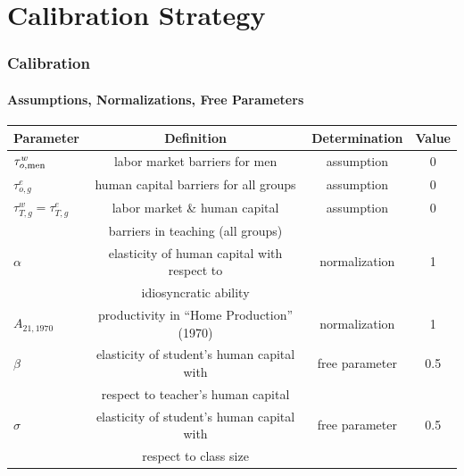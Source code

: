\documentclass[11pt,hyperref={bookmarks=false},table,aspectratio=169]{beamer}
\begin{document}
\section{Calibration Strategy}	
\begin{frame}
\frametitle{Calibration}
\framesubtitle{Assumptions, Normalizations, Free Parameters}
  \footnotesize
	
	\begin{table}[h!]
		\centering
		\begin{tabular}{lccc}
			\toprule
			Parameter & Definition & Determination & Value\\
			\midrule
			$\tau^{w}_{o,{\rm men}}$ & labor market barriers for men & assumption & 0 \\
			$\tau^{e}_{o,g}$ & human capital barriers for all groups & assumption & 0 \\
			$\tau^{w}_{T,g}=\tau^{e}_{T,g}$ & labor market \& human capital & assumption & 0 \\
			& barriers in teaching (all groups)&\\
	\midrule
			$\alpha$ & elasticity of human capital with respect to & normalization & 1 \\
			& idiosyncratic ability & \\
            $A_{21,1970}$ & productivity in ``Home Production'' (1970) & normalization & 1 \\
	\midrule
   			$\beta$ & elasticity of student's human capital with & free parameter & 0.5\\
    &  respect to teacher's human capital & \\
            $\sigma$ & elasticity of student's human capital with & free parameter & 0.5 \\
            & respect to class size & \\
			\bottomrule
		\end{tabular}
		\label{tab:assump}
	\end{table}
\end{frame}
\end{document}
